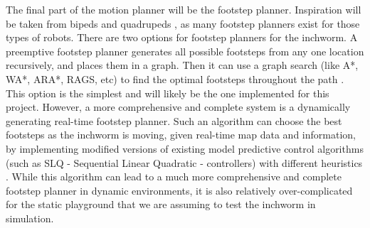 The final part of the motion planner will be the footstep planner. Inspiration will be taken from bipeds and quadrupeds \cite{LeggedRobotsNavPlanning}, as many footstep planners exist for those types of robots. There are two options for footstep planners for the inchworm. A preemptive footstep planner generates all possible footsteps from any one location recursively, and places them in a graph. Then it can use a graph search (like A*, WA*, ARA*, RAGS, etc) to find the optimal footsteps throughout the path \cite{SearchFootstepPlanner}. This option is the simplest and will likely be the one implemented for this project. However, a more comprehensive and complete system is a dynamically generating real-time footstep planner. Such an algorithm can choose the best footsteps as the inchworm is moving, given real-time map data and information, by implementing modified versions of existing model predictive control algorithms (such as SLQ - Sequential Linear Quadratic - controllers) with different heuristics \cite{MotionPlanningInchworm} \cite{ModelPredictiveControl}. While this algorithm can lead to a much more comprehensive and complete footstep planner in dynamic environments, it is also relatively over-complicated for the static playground that we are assuming to test the inchworm in simulation.